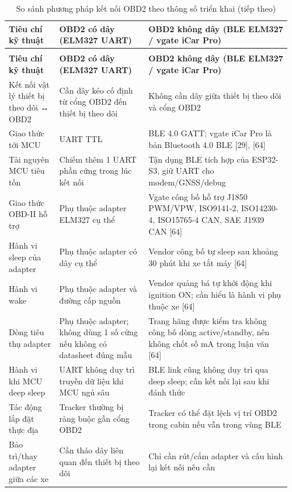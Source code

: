 \documentclass[a4paper]{extarticle}
\newcommand{\thesissettableid}[2]{%
  \renewcommand{\thetable}{#1}%
  \renewcommand{\theHtable}{#2}%
}
\begin{document}
{\thesissettableid{3.5}{tab-ch3-so-sanh-phuong-phap-ket-noi-obd2-theo-thong-so-trien-khai}
\def\LTcaptype{table}
\begin{longtable}{|L{0.177\linewidth}|L{0.303\linewidth}|L{0.484\linewidth}|}
\caption{So sánh phương pháp kết nối OBD2 theo thông số triển khai}\label{tab:ch3-so-sanh-phuong-phap-ket-noi-obd2-theo-thong-so-trien-khai}\\
\hline \textbf{Tiêu chí kỹ thuật} & \textbf{OBD2 có dây (ELM327 UART)} & \textbf{OBD2 không dây (BLE
ELM327 / vgate iCar Pro)} \\
\hline
\endfirsthead
\caption[]{So sánh phương pháp kết nối OBD2 theo thông số triển khai (tiếp theo)}\\
\hline \textbf{Tiêu chí kỹ thuật} & \textbf{OBD2 có dây (ELM327 UART)} & \textbf{OBD2 không dây (BLE
ELM327 / vgate iCar Pro)} \\
\hline
\endhead
\hline
\endfoot
\endlastfoot
Kết nối vật lý thiết bị theo dõi ↔ OBD2 & Cần dây kéo cố định từ cổng OBD2 đến
thiết bị theo dõi & Không cần dây giữa thiết bị theo dõi và cổng OBD2 \\\hline
Giao thức tới MCU & UART TTL & BLE 4.0 GATT; vgate iCar Pro là bản
Bluetooth 4.0 BLE {[}29{]}, {[}64{]} \\\hline
Tài nguyên MCU tiêu tốn & Chiếm thêm 1 UART phần cứng trong lúc kết nối
& Tận dụng BLE tích hợp của ESP32-S3, giữ UART cho modem/GNSS/debug \\\hline
Giao thức OBD-II hỗ trợ & Phụ thuộc adapter ELM327 cụ thể & Vgate công
bố hỗ trợ J1850 PWM/VPW, ISO9141-2, ISO14230-4, ISO15765-4 CAN, SAE
J1939 CAN {[}64{]} \\\hline
Hành vi sleep của adapter & Phụ thuộc adapter có dây cụ thể & Vendor
công bố tự sleep sau khoảng 30 phút khi xe tắt máy {[}64{]} \\\hline
Hành vi wake & Phụ thuộc adapter và đường cấp nguồn & Vendor quảng bá tự
khởi động khi ignition ON; cần hiểu là hành vi phụ thuộc xe {[}64{]} \\\hline
Dòng tiêu thụ adapter & Phụ thuộc adapter; không dùng 1 số cứng nếu
không có datasheet đúng mẫu & Trang hãng được kiểm tra không công bố
dòng active/standby, nên không chốt số mA trong luận văn {[}64{]} \\\hline
Hành vi khi MCU deep sleep & UART không duy trì truyền dữ liệu khi MCU
ngủ sâu & BLE link cũng không duy trì qua deep sleep; cần kết nối lại sau
khi đánh thức \\\hline
Tác động lắp đặt thực địa & Tracker thường bị ràng buộc gần cổng OBD2 &
Tracker có thể đặt lệch vị trí OBD2 trong cabin nếu vẫn trong vùng
BLE \\\hline
Bảo trì/thay adapter giữa các xe & Cần tháo dây liên quan đến thiết bị theo dõi &
Chỉ cần rút/cắm adapter và cấu hình lại kết nối nếu cần \\\hline
\end{longtable}
}
\end{document}
